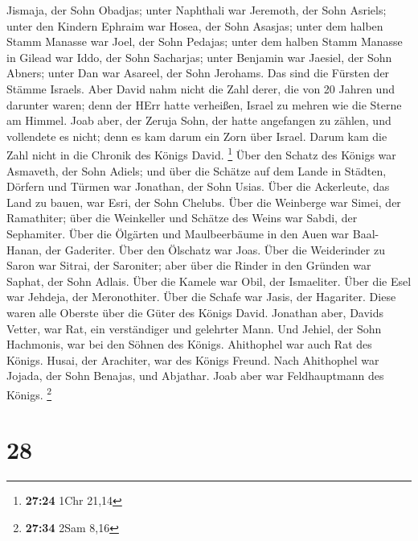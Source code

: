Jismaja, der Sohn Obadjas; unter Naphthali war Jeremoth, der Sohn
Asriels;  unter den Kindern Ephraim war Hosea, der Sohn
Asasjas; unter dem halben Stamm Manasse war Joel, der Sohn Pedajas;
 unter dem halben Stamm Manasse in Gilead war Iddo, der
Sohn Sacharjas; unter Benjamin war Jaesiel, der Sohn Abners;
 unter Dan war Asareel, der Sohn Jerohams. Das sind die
Fürsten der Stämme Israels.  Aber David nahm nicht die
Zahl derer, die von 20 Jahren und darunter waren; denn der HErr hatte
verheißen, Israel zu mehren wie die Sterne am Himmel. 
Joab aber, der Zeruja Sohn, der hatte angefangen zu zählen, und
vollendete es nicht; denn es kam darum ein Zorn über Israel. Darum kam
die Zahl nicht in die Chronik des Königs David. \footnote{\textbf{27:24}
  1Chr 21,14}  Über den Schatz des Königs war Asmaveth,
der Sohn Adiels; und über die Schätze auf dem Lande in Städten, Dörfern
und Türmen war Jonathan, der Sohn Usias.  Über die
Ackerleute, das Land zu bauen, war Esri, der Sohn Chelubs.
 Über die Weinberge war Simei, der Ramathiter; über die
Weinkeller und Schätze des Weins war Sabdi, der Sephamiter.
 Über die Ölgärten und Maulbeerbäume in den Auen war
Baal-Hanan, der Gaderiter. Über den Ölschatz war Joas. 
Über die Weiderinder zu Saron war Sitrai, der Saroniter; aber über die
Rinder in den Gründen war Saphat, der Sohn Adlais.  Über
die Kamele war Obil, der Ismaeliter. Über die Esel war Jehdeja, der
Meronothiter.  Über die Schafe war Jasis, der Hagariter.
Diese waren alle Oberste über die Güter des Königs David.
 Jonathan aber, Davids Vetter, war Rat, ein verständiger
und gelehrter Mann. Und Jehiel, der Sohn Hachmonis, war bei den Söhnen
des Königs.  Ahithophel war auch Rat des Königs. Husai,
der Arachiter, war des Königs Freund.  Nach Ahithophel
war Jojada, der Sohn Benajas, und Abjathar. Joab aber war Feldhauptmann
des Königs. \footnote{\textbf{27:34} 2Sam 8,16}

\hypertarget{section-27}{%
\section{28}\label{section-27}}

